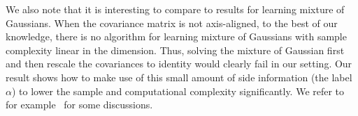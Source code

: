 
We also note that it is interesting to compare to results for learning mixture of Gaussians. When the covariance matrix is not axis-aligned, to the best of our knowledge, there is no algorithm for learning  mixture of Gaussians with sample complexity linear in the dimension. Thus, solving the mixture of Gaussian first and then rescale the covariances to identity would clearly fail in our setting. Our result shows how to make use of this small amount of side information (the label $\alpha$) to lower the sample and computational complexity significantly. We refer to for example~\citep{ashtiani2017sample} for some discussions. 



